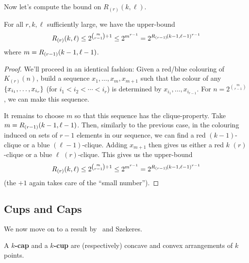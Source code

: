Now let's compute the bound on $R_{(r)}(k, \ell)$.

\begin{boxtheorem}
    For all $r, k, \ell$ sufficiently large, we have the upper-bound
    \begin{align*}
        R_{(r)}\!\left( k, \ell \right) \leq 2^{\binom{m}{r - 1} + 1} \leq 2^{m^{r - 1}} = 2^{R_{(r - 1)}\!\left( k - 1, \ell - 1 \right)^{r - 1}}
    \end{align*}
    where $m = R_{(r - 1)}\!\left( k - 1, \ell - 1 \right)$.
\end{boxtheorem}
\begin{proof}
    We'll proceed in an identical fashion: Given a red/blue colouring of $K_{(r)}(n)$, build a sequence $x_1, \ldots, x_m, x_{m + 1}$ such that the colour of any $\left\{ x_{i_1}, \ldots, x_{i_r} \right\}$ (for $i_1 < i_2 < \cdots < i_r$) is determined by $x_{i_1}, \ldots, x_{i_{r - 1}}$. For $n = 2^{\binom{m}{r - 1}}$, we can make this sequence.

    It remains to choose $m$ so that this sequence has the clique-property. Take $m = R_{(r - 1)}\!\left( k - 1, \ell - 1 \right)$. Then, similarly to the previous case, in the colouring induced on sets of $r - 1$ elements in our sequence, we can find a red $(k - 1)$-clique or a blue $(\ell - 1)$-clique. Adding $x_{m + 1}$ then gives us either a red $k$ $(r)$-clique or a blue $\ell$ $(r)$-clique. This gives us the upper-bound
    \begin{align*}
        R_{(r)}\!\left( k, \ell \right) \leq 2^{\binom{m}{r - 1} + 1} \leq 2^{m^{r - 1}} = 2^{R_{(r - 1)}\!\left( k - 1, \ell - 1 \right)^{r - 1}}
    \end{align*}
    (the $+1$ again takes care of the ``small number'').
\end{proof}

\subsection{Cups and Caps}

We now move on to a result by \Erdos\ and Szekeres.

\begin{boxdefinition}
    A \textbf{$k$-cap} and a \textbf{$k$-cup} are (respectively) concave and convex arrangements of $k$ points.
\end{boxdefinition}

\begin{figure}[H]
    \centering
    \hspace{2cm}
\end{figure}

